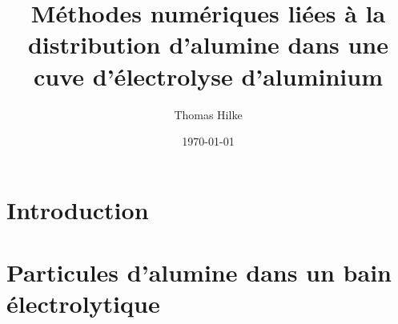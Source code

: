 \documentclass[a4paper,11pt]{book}
\title{M\'ethodes num\'eriques li\'ees \`a la distribution d'alumine dans une cuve d'\'electrolyse d'aluminium}
\date{\today}
\author{Thomas Hilke}
\begin{document}
\maketitle

\tableofcontents



\chapter{Introduction}
\label{chap:introduction}


\chapter{Particules d'alumine dans un bain \'electrolytique}
\label{chap:particles}

\end{document}
